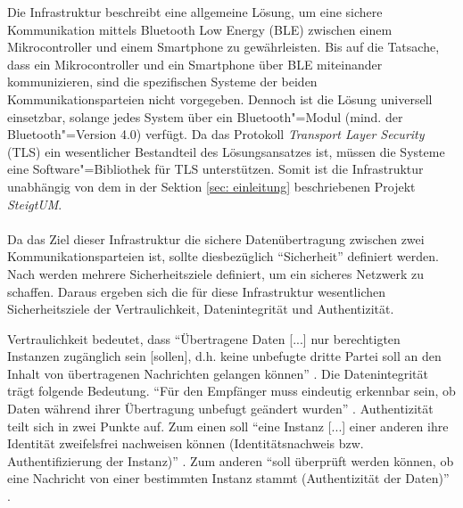 Die Infrastruktur beschreibt eine allgemeine Lösung, um eine sichere Kommunikation mittels Bluetooth Low Energy (BLE) zwischen einem Mikrocontroller und einem Smartphone zu gewährleisten. Bis auf die Tatsache, dass ein Mikrocontroller und ein Smartphone über BLE miteinander kommunizieren, sind die spezifischen Systeme der beiden Kommunikationsparteien nicht vorgegeben. Dennoch ist die Lösung universell einsetzbar, solange jedes System über ein Bluetooth"=Modul (mind. der Bluetooth"=Version 4.0) verfügt. Da das Protokoll \textit{Transport Layer Security} (TLS) ein wesentlicher Bestandteil des Lösungsansatzes ist, müssen die Systeme eine Software"=Bibliothek für TLS unterstützen. Somit ist die Infrastruktur unabhängig von dem in der Sektion \ref{sec: einleitung} beschriebenen Projekt \textit{SteigtUM}.
\\\\
Da das Ziel dieser Infrastruktur die sichere Datenübertragung zwischen zwei Kommunikationsparteien ist, sollte diesbezüglich "`Sicherheit"' definiert werden. Nach \cite{Bless2005_19-20} werden mehrere Sicherheitsziele definiert, um ein sicheres Netzwerk zu schaffen. Daraus ergeben sich die für diese Infrastruktur wesentlichen Sicherheitsziele der Vertraulichkeit, Datenintegrität und Authentizität.

Vertraulichkeit bedeutet, dass "`Übertragene Daten [...] nur berechtigten Instanzen zugänglich sein [sollen], d.h. keine unbefugte dritte Partei soll an den Inhalt von übertragenen Nachrichten gelangen können"' \cite{Bless2005_19}.
Die Datenintegrität trägt folgende Bedeutung. "`Für den Empfänger muss eindeutig erkennbar sein, ob Daten während ihrer Übertragung unbefugt geändert wurden"' \cite{Bless2005_19}.
Authentizität teilt sich in zwei Punkte auf. Zum einen soll "`eine Instanz [...] einer anderen ihre Identität zweifelsfrei nachweisen können (Identitätsnachweis bzw. Authentifizierung der Instanz)"' \cite{Bless2005_19}. 
Zum anderen "`soll überprüft werden können, ob eine Nachricht von einer bestimmten Instanz stammt (Authentizität der Daten)"' \cite{Bless2005_19}.
